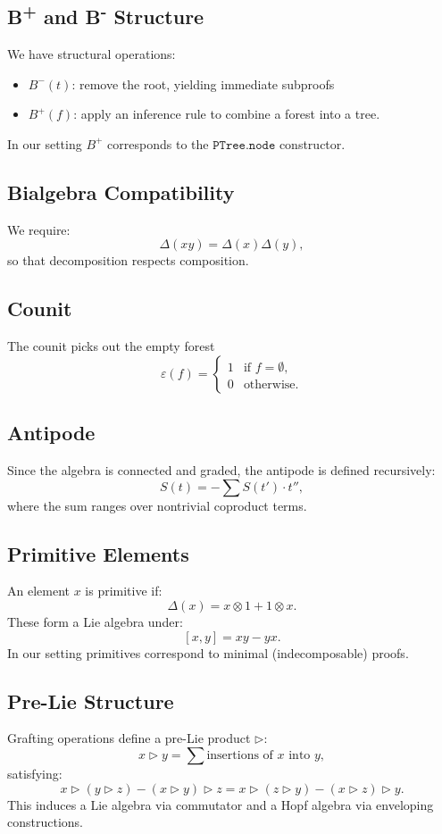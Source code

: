 \documentclass[a4paper,11pt]{report}
\begin{document}
\subsection*{B\textsuperscript{+} and B\textsuperscript{-} Structure}
We have structural operations:
\begin{itemize}
\item $B^{-}(t)$: remove the root, yielding immediate subproofs
\item $B^{+}(f)$: apply an inference rule to combine a forest into a tree.
\end{itemize}
In our setting $B^{+}$ corresponds to the $\texttt{PTree.node}$ constructor.

\subsection*{Bialgebra Compatibility}
We require:
\[
\Delta(xy) = \Delta(x)\Delta(y),
\]
so that decomposition respects composition.

\subsection*{Counit}
The counit picks out the empty forest
\[
\varepsilon(f) =
\begin{cases}
1 & \text{if } f = \emptyset,\\
0 & \text{otherwise}.
\end{cases}
\]

\subsection*{Antipode}
Since the algebra is connected and graded, the antipode is defined recursively:
\[
S(t) = - \sum S(t') \cdot t'',
\]
where the sum ranges over nontrivial coproduct terms.

\subsection*{Primitive Elements}
An element $x$ is primitive if:
\[
\Delta(x) = x \otimes 1 + 1 \otimes x.
\]
These form a Lie algebra under:
\[
[x,y] = xy - yx.
\]
In our setting primitives correspond to minimal (indecomposable) proofs.

\subsection*{Pre-Lie Structure}
Grafting operations define a pre-Lie product $\triangleright$:
\[
x \triangleright y = \sum \text{insertions of } x \text{ into } y,
\]
satisfying:
\[
x \triangleright (y \triangleright z) - (x \triangleright y) \triangleright z
=
x \triangleright (z \triangleright y) - (x \triangleright z) \triangleright y.
\]
This induces a Lie algebra via commutator and a Hopf algebra via enveloping constructions.
\end{document}
